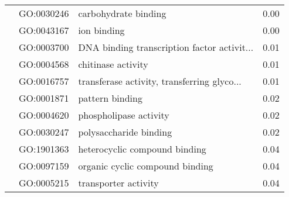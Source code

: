 \begin{longtable}{lllr}
   & GO:0030246 &                         carbohydrate binding &          0.00 \\
   & GO:0043167 &                                  ion binding &          0.00 \\
   & GO:0003700 &  DNA binding transcription factor activit... &          0.01 \\
   & GO:0004568 &                           chitinase activity &          0.01 \\
   & GO:0016757 &  transferase activity, transferring glyco... &          0.01 \\
   & GO:0001871 &                              pattern binding &          0.02 \\
   & GO:0004620 &                       phospholipase activity &          0.02 \\
   & GO:0030247 &                       polysaccharide binding &          0.02 \\
   & GO:1901363 &                heterocyclic compound binding &          0.04 \\
   & GO:0097159 &              organic cyclic compound binding &          0.04 \\
   & GO:0005215 &                         transporter activity &          0.04 \\
\end{longtable}
